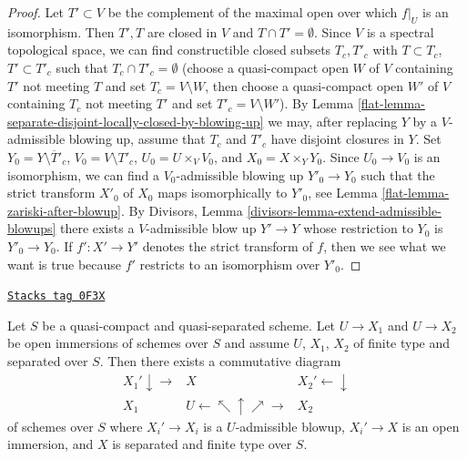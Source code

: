 \begin{proof}

Let $T' \subset V$ be the complement of the maximal open over which
$f|_U$ is an isomorphism. Then $T', T$ are closed in $V$ and
$T \cap T' = \emptyset$. Since $V$ is a spectral topological
space, we can find constructible closed subsets $T_c, T'_c$
with $T \subset T_c$, $T' \subset T'_c$ such that
$T_c \cap T'_c = \emptyset$ (choose a quasi-compact
open $W$ of $V$ containing $T'$ not meeting $T$
and set $T_c = V \setminus W$, then choose a quasi-compact
open $W'$ of $V$ containing $T_c$ not meeting $T'$
and set $T'_c = V \setminus W'$).
By Lemma \ref{flat-lemma-separate-disjoint-locally-closed-by-blowing-up}
we may, after replacing $Y$ by a $V$-admissible blowing up,
assume that $T_c$ and $T'_c$ have disjoint closures in $Y$.
Set $Y_0 = Y \setminus \overline{T}'_c$, $V_0 = V \setminus T'_c$,
$U_0 = U \times_V V_0$, and $X_0 = X \times_Y Y_0$.
Since $U_0 \to V_0$ is an isomorphism, we can find a
$V_0$-admissible blowing up $Y'_0 \to Y_0$ such that the
strict transform $X'_0$ of $X_0$ maps isomorphically to $Y'_0$, see
Lemma \ref{flat-lemma-zariski-after-blowup}.
By Divisors, Lemma \ref{divisors-lemma-extend-admissible-blowups}
there exists a $V$-admissible blow up $Y' \to Y$ whose restriction
to $Y_0$ is $Y'_0 \to Y_0$. If $f' : X' \to Y'$ denotes the
strict transform of $f$, then we see what we want is true because
$f'$ restricts to an isomorphism over $Y'_0$.
\end{proof}

\begin{lemma}
\label{flat-lemma-find-common-blowups}
\href{https://stacks.math.columbia.edu/tag/0F3X}{\texttt{Stacks tag 0F3X}}

Let $S$ be a quasi-compact and quasi-separated scheme.
Let $U \to X_1$ and $U \to X_2$ be open immersions
of schemes over $S$ and assume $U$, $X_1$, $X_2$ of finite
type and separated over $S$. Then there exists a commutative diagram
$$
\begin{array}{ccc}X_1' \downarrow\longrightarrow & X & X_2' \longleftarrow\downarrow \\ X_1 & U \longleftarrow\nwarrow\uparrow\nearrow\longrightarrow & X_2\end{array}
$$
of schemes over $S$ where $X_i' \to X_i$ is a $U$-admissible
blowup, $X_i' \to X$ is an open immersion, and $X$ is separated and finite
type over $S$.
\end{lemma}

